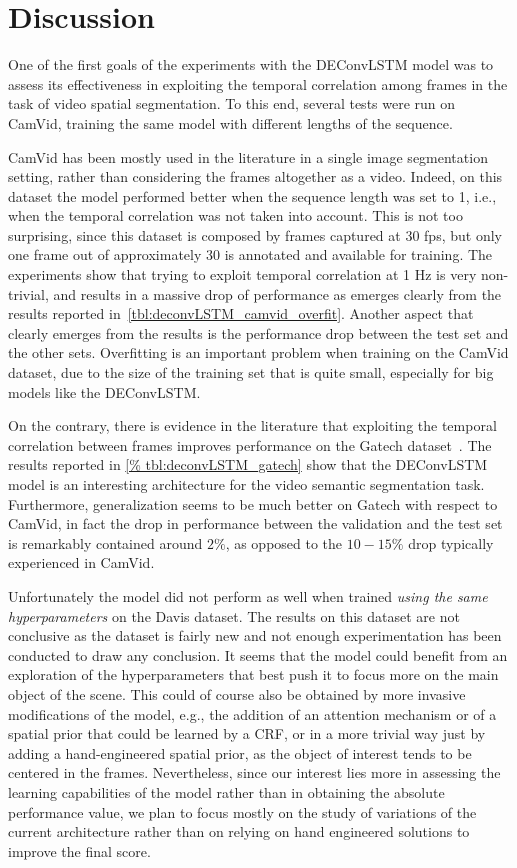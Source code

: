 \section{Discussion}\label{sec:deconvLSTM_discussion}
One of the first goals of the experiments with the DEConvLSTM model was to
assess its effectiveness in exploiting the temporal correlation among frames in
the task of video spatial segmentation. To this end, several tests were run on
CamVid, training the same model with different lengths of the sequence.

CamVid has been mostly used in the literature in a single image
segmentation setting, rather than considering the frames altogether as a video.
Indeed, on this dataset the model performed better when the sequence length was
set to 1, i.e., when the temporal correlation was not taken into account. This
is not too surprising, since this dataset is composed by frames captured at 30
fps, but only one frame out of approximately 30 is annotated and available for
training. The experiments show that trying to exploit temporal correlation at 1
Hz is very non-trivial, and results in a massive drop of performance as
emerges clearly from the results reported
in~\autoref{tbl:deconvLSTM_camvid_overfit}. Another aspect that clearly emerges
from the results is the performance drop between the test set and the other
sets. Overfitting is an important problem when training on the CamVid dataset,
due to the size of the training set that is quite small, especially for big
models like the DEConvLSTM.

On the contrary, there is evidence in the literature that exploiting the
temporal correlation between frames improves performance on the Gatech
dataset~\citep{Tran16v2v}. The results reported in \autoref{%
tbl:deconvLSTM_gatech} show that the DEConvLSTM model is an interesting
architecture for the video semantic segmentation task. Furthermore,
generalization seems to be much better on Gatech with respect to CamVid, in
fact the drop in performance between the validation and the test set is
remarkably contained around $2\%$, as opposed to the $10-15\%$ drop typically
experienced in CamVid.

Unfortunately the model did not perform as well when trained \emph{using the
same hyperparameters} on the Davis dataset. The results on this dataset are not
conclusive as the dataset is fairly new and not enough experimentation has been
conducted to draw any conclusion. It seems that the model could benefit from an
exploration of the hyperparameters that best push it to focus more on the main
object of the scene. This could of course also be obtained by more invasive
modifications of the model, e.g., the addition of an attention mechanism or of
a spatial prior that could be learned by a CRF, or in a more trivial way just
by adding a hand-engineered spatial prior, as the object of interest tends to
be centered in the frames. Nevertheless, since our interest lies more in
assessing the learning capabilities of the model rather than in obtaining the
absolute performance value, we plan to focus mostly on the study of variations
of the current architecture rather than on relying on hand engineered solutions
to improve the final score.

